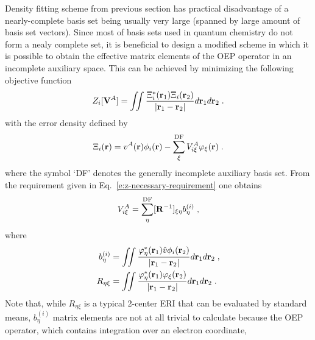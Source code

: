 Density fitting scheme from previous section has practical disadvantage of a nearly\hyp{}complete basis set
being usually very large (spanned by large amount of basis set vectors). 
Since most of basis sets used in quantum chemistry do not form a nealy complete
set, it is beneficial to design a modified scheme in which it is possible to obtain the effective 
matrix elements of the OEP operator in an incomplete auxiliary space. This can be achieved by minimizing 
the following objective function
%
\begin{equation} \label{e:z-incompl}
	Z_i[{\bf V}^A] = \iint 
        \frac{ \Xi_i^*({\bf r}_1) \Xi_i({\bf r}_2) }{\vert {\bf r}_1 - {\bf r}_2 \vert}  
         d{\bf r}_1 d{\bf r}_2  \;.
\end{equation}
%
with the error density defined by
%
\begin{equation} \label{e:error-incompl}
 \Xi_i({\bf r}) = v^A({\bf r}) \phi_i({\bf r}) - \sum_\xi^{\rm DF} V^A_{i\xi} \varphi_\xi({\bf r}) \;.
\end{equation}
%
where the symbol `DF' denotes the generally incomplete auxiliary basis set.
From the requirement given in Eq.~\eqref{e:z-necessary-requirement}
one obtains
%
\begin{equation} \label{e:v-incompl}
  V^A_{i\xi} = \sum_\eta^{\rm DF} [{\bf R}^{-1}]_{\xi\eta} b^{(i)}_\eta \;,
\end{equation}
%
where 
%
\begin{subequations}
\begin{align}
 b^{(i)}_\eta &= \iint 
                       \frac{ \varphi^*_\eta({\bf r}_1) \hat{v} \phi_i({\bf r}_2) } 
                            {\vert {\bf r}_1 - {\bf r}_2\vert}  
                 d{\bf r}_1 d{\bf r}_2 \;, \\
 R_{\eta\xi}  &= \iint 
                       \frac{ \varphi^*_\eta({\bf r}_1) \varphi_\xi({\bf r}_2) } 
                            {\vert {\bf r}_1 - {\bf r}_2\vert}  
                 d{\bf r}_1 d{\bf r}_2 \;.
\end{align}
\end{subequations}
%
Note that, while $R_{\eta\xi}$ is a typical 2\hyp{}center ERI 
that can be evaluated by standard means,\cite{McMurchie.Davidson.JComputPhys.1978}
$b^{(i)}_\eta$ matrix elements are not at all trivial to calculate
because the OEP operator, which contains integration over an electron coordinate,
